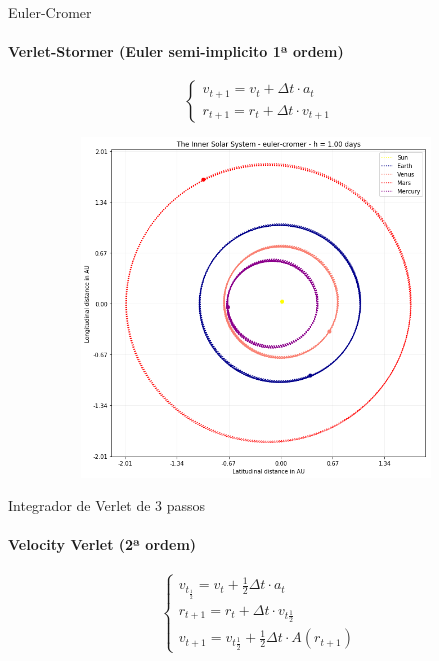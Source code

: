 \documentclass{beamer}
\begin{document}
    \begin{frame}{Euler-Cromer}
      \framesubtitle{Verlet-Stormer (Euler semi-implicito 1ª ordem)}%
      \[
      \begin{cases}
        v_{t+1} = v_{t} + \Delta t \cdot a_t\\
        r_{t+1} = r_{t} + \Delta t \cdot v_{t+1}
      \end{cases}
      \]
    \end{frame}

    \begin{frame}
      \begin{figure}[h]
        \vspace{-0.5cm}
        \includegraphics[width=110mm, height = 90mm]{resources/euler_cromer.png}
      \end{figure}
    \end{frame}

    \begin{frame}{Integrador de Verlet de 3 passos}
      \framesubtitle{Velocity Verlet (2ª ordem)}%

      \[
      \begin{cases}
        v_{t_\frac{1}{2}} = v_t + \frac{1}{2} \Delta t \cdot a_t  \\
        r_{t+1} = r_t + \Delta t \cdot v_{t\frac{1}{2}} \\
        v_{t+1} = v_{t\frac{1}{2}} + \frac{1}{2}\Delta t\cdot A(r_{t+1})
      \end{cases}
      \]
    \end{frame}
\end{document}
